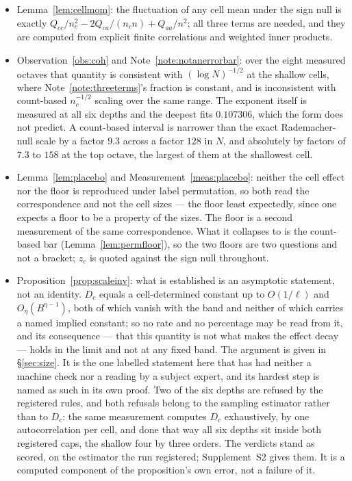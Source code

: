 \documentclass[11pt,a4paper]{article}
\theoremstyle{plain}
\theoremstyle{definition}
\theoremstyle{remark}
\begin{document}
\begin{itemize}
\item Lemma~\ref{lem:cellmom}: the fluctuation of any cell mean under
the sign null is exactly
$Q_{cc}/n_c^2-2Q_{ca}/(n_cn)+Q_{aa}/n^2$; all three terms are needed,
and they are computed from explicit finite correlations and weighted
inner products.

\item Observation~\ref{obs:coh} and Note~\ref{note:notanerrorbar}:
over the eight measured octaves that quantity is consistent with
$(\log N)^{-1/2}$ at the shallow cells, where
Note~\ref{note:threeterms}'s fraction is constant, and is inconsistent
with count-based $n_c^{-1/2}$ scaling over the same range. The exponent
itself is measured at all six
depths and the deepest fits $0.107306$, which the form does not
predict. A
count-based interval is narrower than the exact Rademacher-null scale
by a factor $9.3$ across a factor $128$ in $N$, and absolutely by
factors of $7.3$ to $158$ at the top octave, the largest of them at the
shallowest cell.

\item Lemma~\ref{lem:placebo} and Measurement~\ref{meas:placebo}:
neither the cell effect nor the floor is reproduced under label
permutation, so both read the correspondence and not the cell sizes
--- the floor least expectedly, since one expects a floor to be a
property of the sizes. The floor
is a second measurement of the same correspondence. What it collapses
to is the count-based bar (Lemma~\ref{lem:permfloor}), so the two
floors are two questions and not a bracket; $z_c$ is quoted against
the sign null throughout.

\item Proposition~\ref{prop:scaleinv}: what is established is an
asymptotic statement, not an identity. $D_c$ equals a cell-determined
constant up to $O(1/\ell)$ and $O_\eta(B^{\eta-1})$, both of which
vanish with the band and neither of which carries a named implied
constant; so no rate and no percentage may be read from it, and its
consequence --- that this quantity is not what makes the effect decay
--- holds in the limit and not at any fixed band. The argument is
given in \S\ref{sec:size}. It is the one labelled statement here
that has had neither a machine check nor a reading by a subject
expert, and its hardest step is named as such in its own proof.
Two of the six depths are refused by the registered rules, and both
refusals belong to the sampling estimator rather than to $D_c$: the
same measurement computes $D_c$ exhaustively, by one autocorrelation per
cell, and done that way all six depths sit inside both registered
caps, the shallow four by three orders. The verdicts stand as scored,
on the estimator the run registered; Supplement~S2 gives them. It is a computed component of the proposition's own error, not a failure of it.


\end{itemize}
\end{document}
